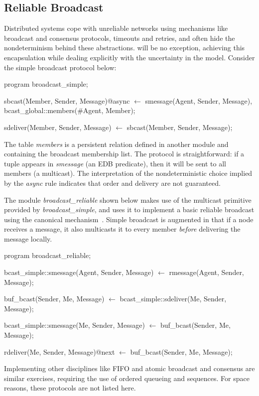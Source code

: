 \subsection{Reliable Broadcast}
Distributed systems cope with unreliable networks using mechanisms like broadcast and consensus protocols, 
timeouts and retries, and often hide the nondeterminism behind these abstractions.  \lang will be no exception,
achieving this encapsulation while dealing explicitly with the uncertainty in the model.  Consider the simple
broadcast protocol below:

\begin{Dedalus}

program broadcast_simple;

sbcast(Member, Sender, Message)@async \(\leftarrow\)
    smessage(Agent, Sender, Message),
    bcast_global::members(#Agent, Member);

sdeliver(Member, Sender, Message) \(\leftarrow\)
    sbcast(Member, Sender, Message);

\end{Dedalus}

The table \emph{members} is a persistent relation defined in another module and containing the broadcast 
membership list.  
The protocol is straightforward: if a tuple appears in \emph{smessage} (an EDB predicate), then
it will be sent to all members (a multicast).  The interpretation of the nondeterministic choice implied by the
\emph{async} rule indicates that order and delivery are not guaranteed.

The module \emph{broadcast\_reliable} shown below makes use of the multicast primitive provided by \emph{broadcast\_simple}, and
uses it to implement a basic reliable broadcast using the canonical mechanism~\cite{mullender}. 
Simple broadcast is augmented in that if a node receives a message, it 
also multicasts it to every member \emph{before} delivering the message locally.  


\begin{Dedalus}
program broadcast_reliable;

bcast_simple::smessage(Agent, Sender, Message)  \(\leftarrow\)
    rmessage(Agent, Sender, Message);

buf_bcast(Sender, Me, Message)  \(\leftarrow\)
    bcast_simple::sdeliver(Me, Sender, Message);

bcast_simple::smessage(Me, Sender, Message)  \(\leftarrow\)
    buf_bcast(Sender, Me, Message);

rdeliver(Me, Sender, Message)@next  \(\leftarrow\)
    buf_bcast(Sender, Me, Message);

\end{Dedalus}


Implementing other disciplines like FIFO and atomic broadcast and consensus are similar exercises, requiring the use of
ordered queueing and sequences.  For space reasons, these protocols are not listed here.